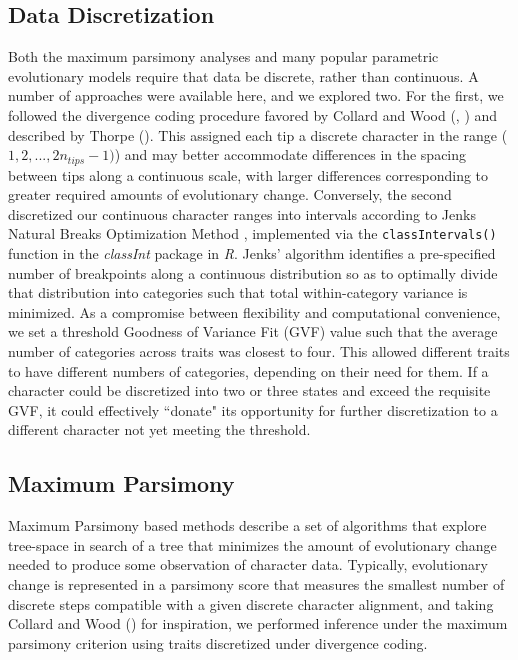 \subsection{Data Discretization}

Both the maximum parsimony analyses and many popular parametric evolutionary models require that data be discrete, rather than continuous. A number of approaches were available here, and we explored two. For the first, we followed the divergence coding procedure favored by Collard and Wood (\citeyear{collardHowReliableAre2000}, \citeyear{collardHowReliableAre2001}) and described by Thorpe (\citeyear{thorpeCodingMorphometricCharacters1984}). This assigned each tip a discrete character in the range ($1, 2, ..., 2n_{tips} - 1)$) and may better accommodate differences in the spacing between tips along a continuous scale, with larger differences corresponding to greater required amounts of evolutionary change. Conversely, the second discretized our continuous character ranges into intervals according to Jenks Natural Breaks Optimization Method \citep{jenksDataModelConcept1967}, implemented via the \texttt{classIntervals()} function in the \textit{classInt} package \citep{bivandPackageClassInt2020} in \textit{R}. Jenks' algorithm identifies a pre-specified number of breakpoints along a continuous distribution so as to optimally divide that distribution into categories such that total within-category variance is minimized. As a compromise between flexibility and computational convenience, we set a threshold Goodness of Variance Fit (GVF) value such that the average number of categories across traits was closest to four. This allowed different traits to have different numbers of categories, depending on their need for them. If a character could be discretized into two or three states and exceed the requisite GVF, it could effectively ``donate" its opportunity for further discretization to a different character not yet meeting the threshold.

\subsection{Maximum Parsimony}

Maximum Parsimony based methods describe a set of algorithms that explore tree-space in search of a tree that minimizes the amount of evolutionary change needed to produce some observation of character data. Typically, evolutionary change is represented in a parsimony score that measures the smallest number of discrete steps compatible with a given discrete character alignment, and taking Collard and Wood (\citeyear{collardHowReliableAre2000}) for inspiration, we performed inference under the maximum parsimony criterion using traits discretized under divergence coding.

